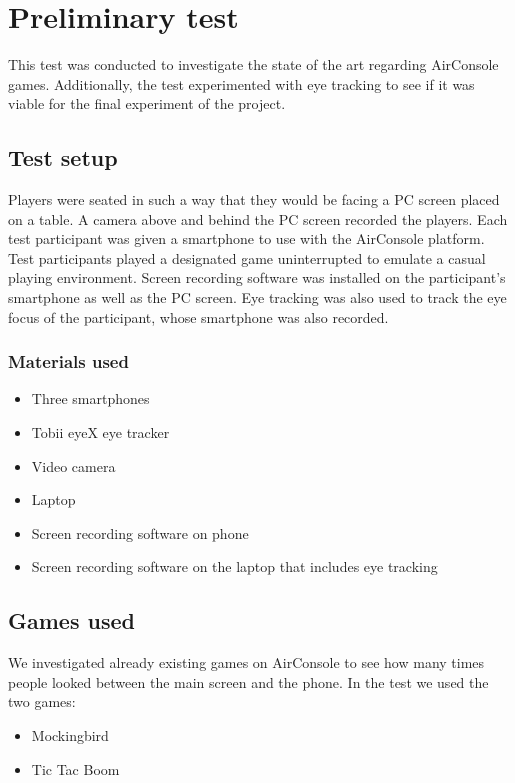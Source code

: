 \chapter{Preliminary test}\label{ch:PreTest}
This test was conducted to investigate the state of the art regarding AirConsole games. Additionally, the test experimented with eye tracking to see if it was viable for the final experiment of the project.

\section{Test setup}
Players were seated in such a way that they would be facing a PC screen placed on a table. A camera above and behind the PC screen recorded the players. Each test participant was given a smartphone to use with the AirConsole platform. Test participants played a designated game uninterrupted to emulate a casual playing environment. Screen recording software was installed on the participant’s smartphone as well as the PC screen. Eye tracking was also used to track the eye focus of the participant, whose smartphone was also recorded.

\subsection{Materials used}
\begin{itemize}
\item Three smartphones
\item Tobii eyeX eye tracker
\item Video camera
\item Laptop
\item Screen recording software on phone
\item Screen recording software on the laptop that includes eye tracking
\end{itemize}
	
\section{Games used}
We investigated already existing games on AirConsole to see how many times people looked between the main screen and the phone. In the test we used the two games:
\begin{itemize}
\item Mockingbird
\item Tic Tac Boom
\end{itemize}

